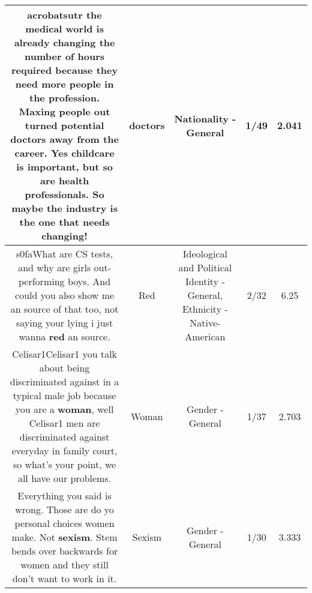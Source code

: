 \documentclass[11pt]{article}
\newlength\mylength
\begin{document}
\begin{center}
\begin{longtable}{|C{.65\mylength}|C{.30\mylength}|C{.12\mylength}|C{.12\mylength}|C{.12\mylength}|}
  \small acrobatsutr the medical world is already changing the number of hours required because they need more people in the profession.  Maxing people out turned potential \textbf{doctors} away from the career.  Yes childcare is important, but so are health professionals.  So maybe the industry is the one that needs changing!\normalsize   & doctors & Nationality - General & 1/49 & 2.041 \\  \hline
  \small s0faWhat are CS tests, and why are girls out-performing boys. And could you also show me an source of that too, not saying your lying i just wanna \textbf{r\textbf{ed}} an source.\normalsize   & Red &  Ideological and Political Identity - General, Ethnicity - Native-American & 2/32 & 6.25 \\  \hline
  \small Celisar1Celisar1 you talk about being discriminated against in a typical male job because you are a \textbf{woman}, well Celisar1 men are discriminated against everyday in family court, so what's your point, we all have our problems.\normalsize   & Woman & Gender - General & 1/37 & 2.703 \\  \hline
  \small Everything you said is wrong. Those are do yo personal choices women make. Not \textbf{sexism}. Stem bends over backwards for women and they still don't want to work in it.\normalsize   & Sexism & Gender - General & 1/30 & 3.333 \\  \hline

\end{longtable}
\end{center}
\end{document}
